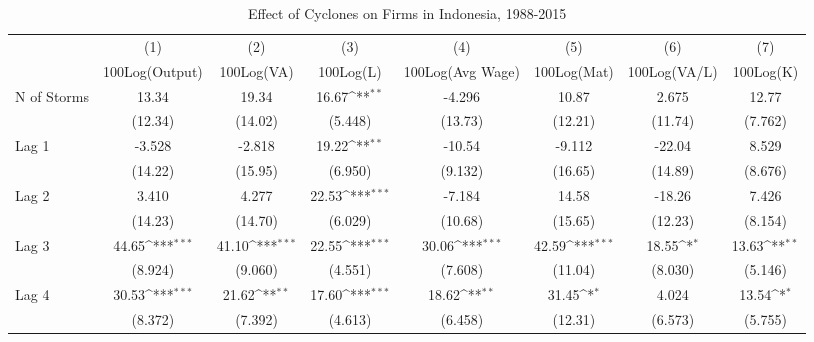 \begin{table}[htbp]\centering
\def\sym#1{\ifmmode^{#1}\else\(^{#1}\)\fi}
\caption{Effect of Cyclones on Firms in Indonesia, 1988-2015}
\begin{tabular}{l*{7}{c}}
\toprule
                &\multicolumn{1}{c}{(1)}&\multicolumn{1}{c}{(2)}&\multicolumn{1}{c}{(3)}&\multicolumn{1}{c}{(4)}&\multicolumn{1}{c}{(5)}&\multicolumn{1}{c}{(6)}&\multicolumn{1}{c}{(7)}\\
                &\multicolumn{1}{c}{100Log(Output)}&\multicolumn{1}{c}{100Log(VA)}&\multicolumn{1}{c}{100Log(L)}&\multicolumn{1}{c}{100Log(Avg Wage)}&\multicolumn{1}{c}{100Log(Mat)}&\multicolumn{1}{c}{100Log(VA/L)}&\multicolumn{1}{c}{100Log(K)}\\
\midrule
N of Storms     &    13.34         &    19.34         &    16.67\sym{**} &   -4.296         &    10.87         &    2.675         &    12.77         \\
                &  (12.34)         &  (14.02)         &  (5.448)         &  (13.73)         &  (12.21)         &  (11.74)         &  (7.762)         \\
\addlinespace
Lag 1           &   -3.528         &   -2.818         &    19.22\sym{**} &   -10.54         &   -9.112         &   -22.04         &    8.529         \\
                &  (14.22)         &  (15.95)         &  (6.950)         &  (9.132)         &  (16.65)         &  (14.89)         &  (8.676)         \\
\addlinespace
Lag 2           &    3.410         &    4.277         &    22.53\sym{***}&   -7.184         &    14.58         &   -18.26         &    7.426         \\
                &  (14.23)         &  (14.70)         &  (6.029)         &  (10.68)         &  (15.65)         &  (12.23)         &  (8.154)         \\
\addlinespace
Lag 3           &    44.65\sym{***}&    41.10\sym{***}&    22.55\sym{***}&    30.06\sym{***}&    42.59\sym{***}&    18.55\sym{*}  &    13.63\sym{**} \\
                &  (8.924)         &  (9.060)         &  (4.551)         &  (7.608)         &  (11.04)         &  (8.030)         &  (5.146)         \\
\addlinespace
Lag 4           &    30.53\sym{***}&    21.62\sym{**} &    17.60\sym{***}&    18.62\sym{**} &    31.45\sym{*}  &    4.024         &    13.54\sym{*}  \\
                &  (8.372)         &  (7.392)         &  (4.613)         &  (6.458)         &  (12.31)         &  (6.573)         &  (5.755)         \\

\end{tabular}
\end{table}
